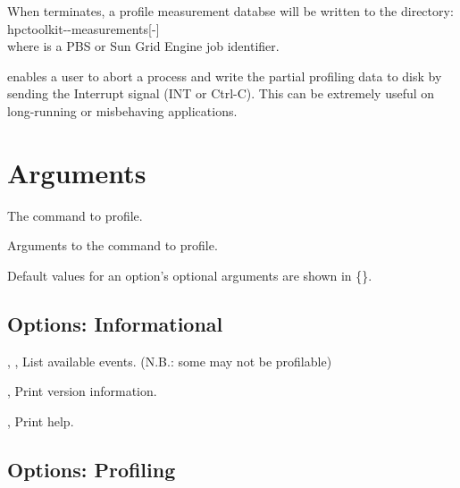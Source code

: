 \documentclass[english]{article}
\begin{document}
When  terminates, a profile measurement databse will be written to the directory:\\
\SP\SP\SP hpctoolkit--measurements[-]\\
where  is a PBS or Sun Grid Engine job identifier.

 enables a user to abort a process and write the partial profiling data to disk by sending the Interrupt signal (INT or Ctrl-C).
This can be extremely useful on long-running or misbehaving applications.


\section{Arguments}

\begin{Description}
\item[\Arg{command}] The command to profile.
\item[\Arg{command-arguments}] Arguments to the command to profile.
\end{Description}

Default values for an option's optional arguments are shown in \{\}.

\subsection{Options: Informational}

\begin{Description}
\item[\Opt{-l}, \Opt{-L}, \Opt{--list-events}]
List available events. (N.B.: some may not be profilable)

\item[\Opt{-V}, \Opt{--version}]
Print version information.

\item[\Opt{-h}, \Opt{--help}]
Print help.
\end{Description}

\subsection{Options: Profiling}
\end{document}
